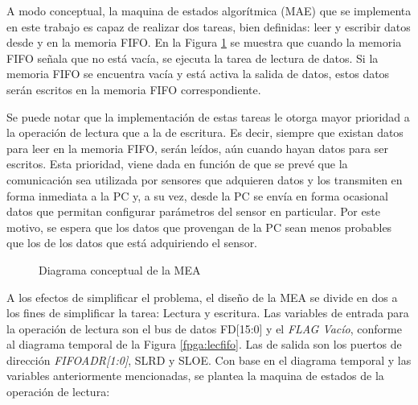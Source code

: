 A modo conceptual, la maquina de estados algorítmica (MAE) que se implementa en este trabajo es capaz de realizar dos tareas, bien definidas: leer y escribir datos desde y en la memoria FIFO. En la Figura \ref{fpga:mea:concepto} se muestra que cuando la memoria FIFO señala que no está vacía, se ejecuta la tarea de lectura de datos. Si la memoria FIFO se encuentra vacía y está activa la salida de datos, estos datos serán escritos en la memoria FIFO correspondiente.

Se puede notar que la implementación de estas tareas le otorga mayor prioridad a la operación de lectura que a la de escritura. Es decir, siempre que existan datos para leer en la memoria FIFO, serán leídos, aún cuando hayan datos para ser escritos.
Esta prioridad, viene dada en función de que se prevé que la comunicación sea utilizada por sensores que adquieren datos y los transmiten en forma inmediata a la PC y, a su vez, desde la PC se envía en forma ocasional datos que permitan configurar parámetros del sensor en particular. Por este motivo, se espera que los datos que provengan de la PC sean menos probables que los de los datos que está adquiriendo el sensor.

\begin{figure}[ht]
	\centering
	\caption{Diagrama conceptual de la MEA}
	\label{fpga:mea:concepto}
\end{figure}

A los efectos de simplificar el problema, el diseño de la MEA se divide en dos a los fines de simplificar la tarea: Lectura y escritura. Las variables de entrada para la operación de lectura son el bus de datos {FD[15:0]\it} y el {\it FLAG Vacío}, conforme al diagrama temporal de la Figura \ref{fpga:lecfifo}. Las de salida son los puertos de dirección {\it FIFOADR[1:0]}, SLRD y SLOE. Con base en el diagrama temporal y las variables anteriormente mencionadas, se plantea la maquina de estados de la operación de lectura:


